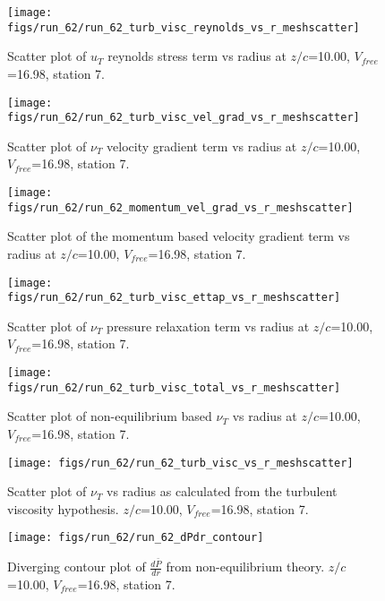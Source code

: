 \begin{figure}[H]
\centering
\texttt{[image: figs/run\_62/run\_62\_turb\_visc\_reynolds\_vs\_r\_meshscatter]}
\caption{Scatter plot of $
u_T$ reynolds stress term vs radius at $z/c$=10.00, $V_{free}$=16.98, station 7.}
\end{figure}


\begin{figure}[H]
\centering
\texttt{[image: figs/run\_62/run\_62\_turb\_visc\_vel\_grad\_vs\_r\_meshscatter]}
\caption{Scatter plot of $\nu_T$ velocity gradient term vs radius at $z/c$=10.00, $V_{free}$=16.98, station 7.}
\end{figure}


\begin{figure}[H]
\centering
\texttt{[image: figs/run\_62/run\_62\_momentum\_vel\_grad\_vs\_r\_meshscatter]}
\caption{Scatter plot of the momentum based velocity gradient term vs radius at $z/c$=10.00, $V_{free}$=16.98, station 7.}
\end{figure}


\begin{figure}[H]
\centering
\texttt{[image: figs/run\_62/run\_62\_turb\_visc\_ettap\_vs\_r\_meshscatter]}
\caption{Scatter plot of $\nu_T$ pressure relaxation term vs radius at $z/c$=10.00, $V_{free}$=16.98, station 7.}
\end{figure}


\begin{figure}[H]
\centering
\texttt{[image: figs/run\_62/run\_62\_turb\_visc\_total\_vs\_r\_meshscatter]}
\caption{Scatter plot of non-equilibrium based $\nu_T$ vs radius at $z/c$=10.00, $V_{free}$=16.98, station 7.}
\end{figure}


\begin{figure}[H]
\centering
\texttt{[image: figs/run\_62/run\_62\_turb\_visc\_vs\_r\_meshscatter]}
\caption{Scatter plot of $\nu_T$ vs radius as calculated from the turbulent viscosity hypothesis. $z/c$=10.00, $V_{free}$=16.98, station 7.}
\end{figure}


\begin{figure}[H]
\centering
\texttt{[image: figs/run\_62/run\_62\_dPdr\_contour]}
\caption{Diverging contour plot of $\frac{d\bar{P}}{dr}$ from non-equilibrium theory. $z/c$=10.00, $V_{free}$=16.98, station 7.}
\end{figure}


